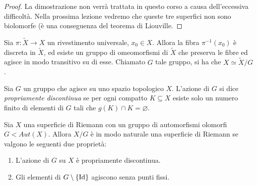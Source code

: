 \begin{proof}
La dimostrazione non verrà trattata in questo corso a causa dell'eccessiva difficoltà.
Nella prossima lezione vedremo che queste tre superfici non sono biolomorfe (è una conseguenza del teorema di Liouville.
\end{proof}
\begin{osservazione}
Sia $\pi:\widetilde{X}\rightarrow X$ un rivestimento universale, $x_0\in X$. Allora la fibra $\pi^{-1}(x_0)$ è discreta in $\widetilde{X}$, ed esiste un gruppo di omeomorfismi di $\widetilde{X}$ che preserva le fibre ed agisce in modo transitivo su di esse. Chiamato $G$ tale gruppo, si ha che $X \simeq \widetilde{X}/G$.
\end{osservazione}
\begin{definizione}
Sia $G$ un gruppo che agisce su uno spazio topologico $X$. L'azione di $G$ si dice \textit{propriamente discontinua} se per ogni compatto $K\subseteq X$ esiste solo un numero finito di elementi di $G$ tali che $g(K)\cap K =\varnothing$.
\end{definizione}
\begin{fatto}
Sia $X$ una superficie di Riemann con un gruppo di automorfismi olomorfi $G<Aut(X)$. Allora $X/G$ è in modo naturale una superficie di Riemann se valgono le seguenti due proprietà:
\begin{enumerate}
  \item L'azione di $G$ su $X$ è propriamente discontinua.
  \item Gli elementi di $G\setminus\{\text{Id}\}$ agiscono senza punti fissi.
\end{enumerate}
\end{fatto}
